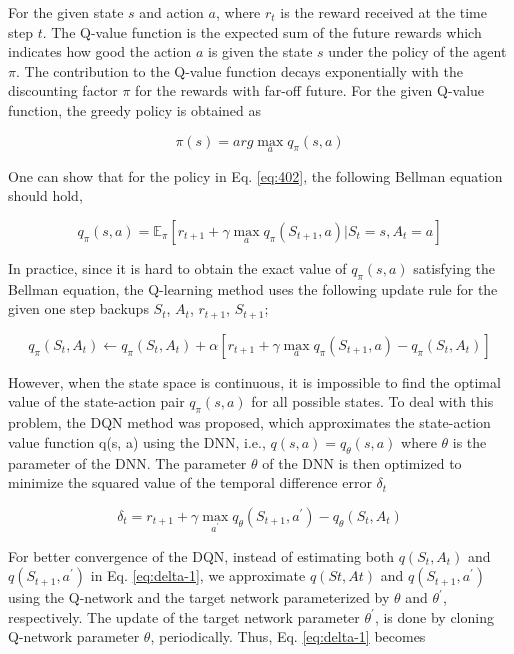 For the given state $s$ and action $a$, where $r_t$ is the reward received at the time step $t$. The Q-value function is the expected sum of the future rewards which indicates how good the action $a$ is given the state $s$ under the policy of the agent $\pi$. The contribution to the Q-value function decays exponentially with the discounting factor $\pi$ for the rewards with far-off future. For the given Q-value function, the greedy policy is obtained as

\begin{equation} \label{eq:402}
\pi(s) = arg \max_a q_{\pi} (s, a) 
\end{equation}

One can show that for the policy in Eq. \ref{eq:402}, the following Bellman equation should hold,

\begin{equation}
q_\pi(s,a) = \mathbb{E}_\pi [r_{t+1} + \gamma \max_a q_\pi(S_{t+1},a) | S_t = s, A_t = a]
\end{equation}

In practice, since it is hard to obtain the exact value of $q_{\pi}(s, a)$ satisfying the Bellman equation, the Q-learning method uses the following update rule for the given one step backups $S_t$, $A_t$, $r_{t+1}$, $S_{t+1}$;

\begin{equation}
q_\pi(S_t,A_t) \gets q_\pi(S_t,A_t) + \alpha \left[r_{t+1} + \gamma \max_a q_\pi(S_{t+1},a) - q_\pi(S_t,A_t)\right]
\end{equation}

However, when the state space is continuous, it is impossible to find the optimal value of the state-action pair $q_{\pi} (s, a)$ for all possible states. To deal with this problem, the DQN method was proposed, which approximates the state-action value function q(s, a) using the DNN, i.e., $q(s, a) = q_\theta(s, a)$ where $\theta$ is the parameter of the DNN. The parameter $\theta$ of the DNN is then optimized to minimize the squared value of the temporal difference error $\delta_t$

\begin{equation} \label{eq:delta-1}
\delta_t = r_{t+1} + \gamma \max_{a^ \prime} q_\theta(S_{t+1},a^ \prime) - q_\theta(S_t,A_t)
\end{equation}

For better convergence of the DQN, instead of estimating both $q(S_t,A_t)$ and $q(S_{t+1},a^ \prime)$ in  Eq. \ref{eq:delta-1}, we approximate $q(St,At)$ and $q(S_{t+1},a^ \prime)$ using the Q-network and the target network parameterized by $\theta$ and $\theta^{\prime}$, respectively. The update of the target network parameter $\theta^{\prime}$, is done by cloning Q-network parameter $\theta$, periodically. Thus, Eq. \ref{eq:delta-1} becomes

